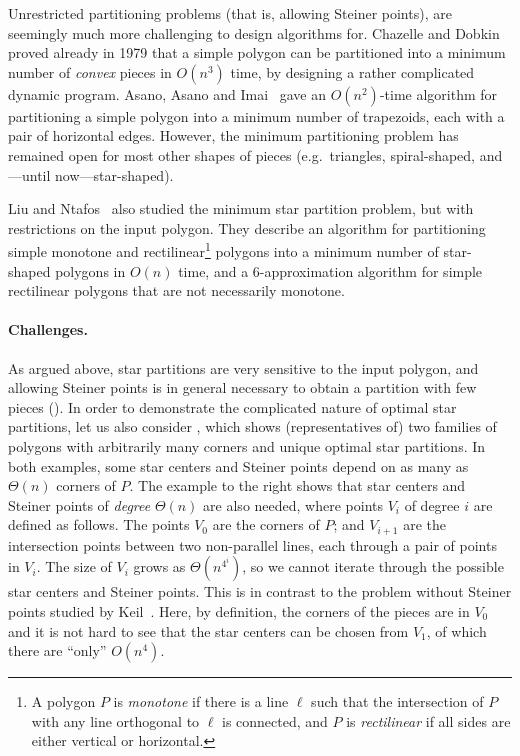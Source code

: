 \documentclass[10pt,a4paper]{article}
\begin{document}
Unrestricted partitioning problems (that is, allowing Steiner points), are seemingly much more challenging to design algorithms for.
Chazelle and Dobkin~\cite{chazelle1980computational,chazelle1985optimal} proved already in 1979 that a simple polygon can be partitioned into a minimum number of \emph{convex} pieces in $O(n^3)$ time, by designing a rather complicated dynamic program.
Asano, Asano and Imai~\cite{DBLP:journals/jacm/AsanoAI86} gave an $O(n^2)$-time algorithm for partitioning a simple polygon into a minimum number of trapezoids, each with a pair of horizontal edges.
However, the minimum partitioning problem has remained open for most other shapes of pieces (e.g.\ triangles, spiral-shaped, and---until now---star-shaped).

Liu and Ntafos~\cite{DBLP:journals/algorithmica/LiuN91} also studied the minimum star partition problem, but with restrictions on the input polygon. They describe an algorithm for partitioning simple monotone and rectilinear\footnote{A polygon $P$ is \emph{monotone} if there is a line $\ell$ such that the intersection of $P$ with any line orthogonal to $\ell$ is connected, and $P$ is \emph{rectilinear} if all sides are either vertical or horizontal.} polygons into a minimum number of star-shaped polygons in $O(n)$ time, and a $6$-approximation algorithm for simple rectilinear polygons that are not necessarily monotone.



\paragraph{Challenges.}
As argued above, star partitions are very sensitive to the input polygon, and allowing Steiner points is in general necessary to obtain a partition with few pieces (). In order to demonstrate the complicated nature of optimal star partitions, let us also consider , which shows (representatives of) two families of polygons with arbitrarily many corners and unique optimal star partitions.
In both examples, some star centers and Steiner points depend on as many as $\Theta(n)$ corners of $P$.
The example to the right shows that star centers and Steiner points of \emph{degree} $\Theta(n)$ are also needed, where points $V_i$ of degree $i$ are defined as follows.
The points $V_0$ are the corners of $P$; and $V_{i+1}$ are the intersection points between two non-parallel lines, each through a pair of points in $V_i$.
The size of $V_i$ grows as $\Theta(n^{4^i})$, so we cannot iterate through the possible star centers and Steiner points.
This is in contrast to the problem without Steiner points studied by Keil~\cite{DBLP:journals/siamcomp/Keil85}.
Here, by definition, the corners of the pieces are in $V_0$ and it is not hard to see that the star centers can be chosen from $V_1$, of which there are ``only'' $O(n^4)$.
\end{document}
